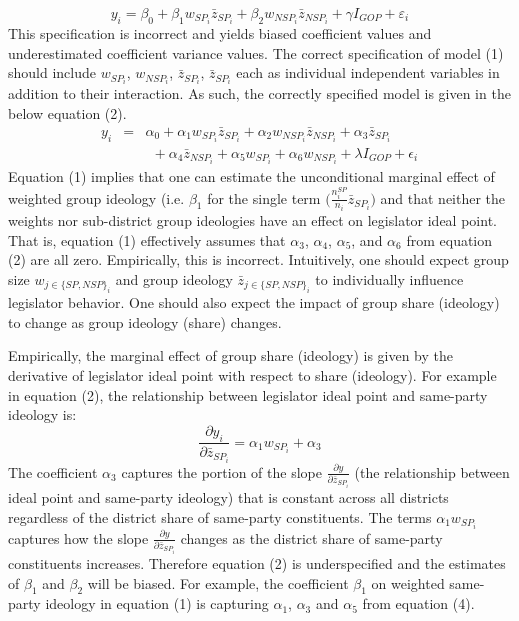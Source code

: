\documentclass[10pt,letterpaper]{article}
\begin{document}
\begin{equation}
y_i  = \beta_0 + \beta_1 w_{SP_i} \bar{z}_{SP_i} + \beta_2 w_{NSP_i} \bar{z}_{NSP_i} + \gamma I_{GOP} + \varepsilon_i
\end{equation}
This specification is incorrect and yields biased coefficient values and underestimated coefficient variance values. The correct specification of model (1) should include $w_{SP_i}$, $w_{NSP_i}$, $\bar{z}_{SP_i}$, $\bar{z}_{SP_i}$ each as individual independent variables in addition to their interaction. As such, the correctly specified model is given in the below equation (2).
\begin{equation}
\begin{array}{ccc}
y_i & = & \alpha_0 + \alpha_1 w_{SP_i} \bar{z}_{SP_i} + \alpha_2 w_{NSP_i} \bar{z}_{NSP_i} + \alpha_3 \bar{z}_{SP_i}~~~~~~~~~\\ 
& & ~~+ \alpha_4 \bar{z}_{NSP_i} + \alpha_5 w_{SP_i} + \alpha_6 w_{NSP_i} + \lambda I_{GOP} + \epsilon_i
\end{array}
\end{equation}
Equation (1) implies that one can estimate the unconditional marginal effect of weighted group ideology (i.e. $\beta_1$ for the single term $\big( \frac{n_i^{SP}}{n_i} \bar{z}_{SP_i}\big)$ and that neither the weights nor sub-district group ideologies have an effect on legislator ideal point. That is, equation (1) effectively assumes that $\alpha_3$, $\alpha_4$, $\alpha_5$, and $\alpha_6$ from equation (2) are all zero. Empirically, this is incorrect. Intuitively, one should expect group size $w_{j\in \{SP,NSP\}_i}$ and group ideology $\bar{z}_{j\in \{SP,NSP\}_i}$ to individually influence legislator behavior. One should also expect the impact of group share (ideology) to change as group ideology (share) changes.

Empirically, the marginal effect of group share (ideology) is given by the derivative of legislator ideal point with respect to share (ideology). For example in equation (2), the relationship between legislator ideal point and same-party ideology is: 
$$\frac{\partial y_i}{\partial \bar{z}_{SP_i}}= \alpha_1 w_{SP_i} + \alpha_3$$
The coefficient $\alpha_3$ captures the portion of the slope $\frac{\partial y}{\partial \bar{z}_{SP_i}}$ (the relationship between ideal point and same-party ideology) that is constant across all districts regardless of the district share of same-party constituents. The terms $\alpha_1 w_{SP_i}$ captures how the slope $\frac{\partial y}{\partial \bar{z}_{SP_i}}$ changes as the district share of same-party constituents increases. Therefore equation (2) is underspecified and the estimates of $\beta_1$ and $\beta_2$ will be biased. For example, the coefficient $\beta_1$ on weighted same-party ideology in equation (1) is capturing $\alpha_1$, $\alpha_3$ and $\alpha_5$ from equation (4).
\end{document}
